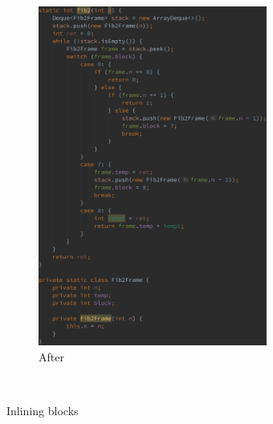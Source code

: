 \begin{figure}[htb]
{\begin{subfigure}[b]{.6\textwidth}
        \includegraphics[height=4.4in]{src/img/inline-blocks-after-44.png}
        \caption{After}
    \end{subfigure}%
    }\\
    \caption{Inlining blocks \label{img:inline-blocks}}
\end{figure}